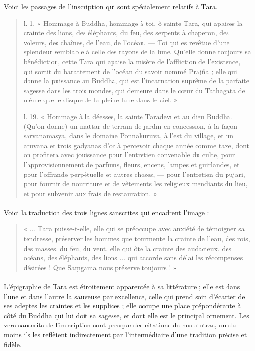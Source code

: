 \documentclass[a4paper, 11pt, oneside, french, landscape, twocolumn]{article}
\begin{document}
Voici les passages de l'inscription qui sont spécialement relatifs à T\={a}r\={a}.
\begin{quotation}\footnotesize
l. 1. « Hommage à Buddha, hommage à toi, ô sainte T\={a}r\={a}, qui apaises la crainte des lions, des éléphants, du feu, des serpents à chaperon, des voleurs, des chaînes, de l'eau, de l'océan. --- Toi qui es revêtue d'une splendeur semblable à celle des rayons de la lune. Qu'elle donne toujours sa bénédiction, cette T\={a}r\={a} qui apaise la misère de l'affliction de l'existence, qui sortit du barattement de l'océan du savoir nommé Praj\~{n}\={a} ; elle qui donne la puissance au Buddha, qui est l'incarnation suprême de la parfaite sagesse dans les trois mondes, qui demeure dans le cœur du Tath\={a}gata de même que le disque de la pleine lune dans le ciel. »

\bigskip

l. 19. « Hommage à la déesses, la sainte T\={a}r\={a}dev\={\i} et au dieu Buddha. (Qu'on donne) un mattar de terrain de jardin en concession, à la façon sarvanamasya, dans le domaine Ponnakuruva, à l'est du village, et un aruvana et trois gadyanas d'or à percevoir chaque année comme taxe, dont on profitera avec jouissance pour l'entretien convenable du culte, pour l'approvisionnement de parfums, fleurs, encens, lampes et guirlandes, et pour l'offrande perpétuelle et autres choses, --- pour l'entretien du p\={u}j\={a}ri, pour fournir de nourriture et de vêtements les religieux mendiants du lieu, et pour subvenir aux frais de restauration. »
\end{quotation}
\paragraph{}
Voici la traduction des trois lignes sanscrites qui encadrent l'image :
\begin{quotation}\footnotesize
« ... T\={a}r\={a} puisse-t-elle, elle qui se préoccupe avec anxiété de témoigner sa tendresse, préserver les hommes que tourmente la crainte de l'eau, des rois, des masses, du feu, du vent, elle qui ôte la crainte des audacieux, des océans, des éléphants, des lions ... qui accorde sans délai les récompenses désirées ! Que Sa\d{m}gama nous préserve toujours ! »
\end{quotation}
\paragraph{}
L'épigraphie de T\={a}r\={a} est étroitement apparentée à sa littérature ; elle est dans l'une et dans l'autre la sauveuse par excellence, celle qui prend soin d'écarter de ses adeptes les craintes et les supplices ; elle occupe une place prépondérante à côté du Buddha qui lui doit sa sagesse, et dont elle est le principal ornement. Les vers sanscrits de l'inscription sont presque des citations de nos stotras, ou du moins ils les reflètent indirectement par l'intermédiaire d'une tradition précise et fidèle.
\end{document}
